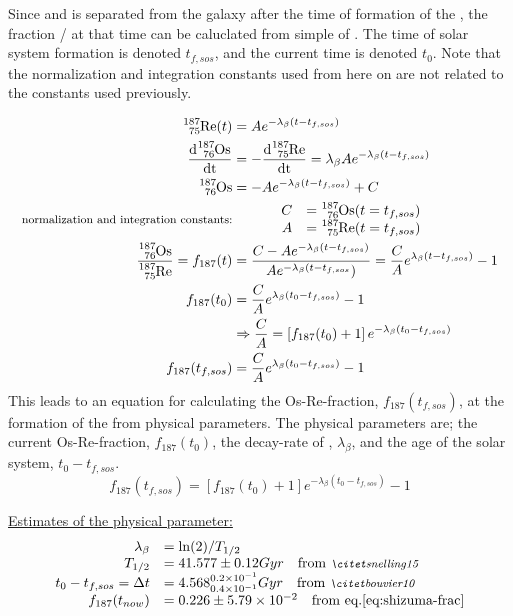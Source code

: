 Since  and  is separated from the galaxy after the time of formation of the \sos,
the fraction / at that time can be caluclated from simple \betadecay of .
The time of solar system formation is denoted $t_{f,sos}$, and the current time is denoted $t_0$.
Note that the normalization and integration constants used from here on are not related to the constants used previously.

\begin{align*}
  \re{187}(t) &= A e^{-\lambda_\beta (t-t_{f,sos})} \\
  \d{\os{187}} &= -\d{\re{187}} = \lambda_\beta A e^{-\lambda_\beta (t-t_{f,sos})} \\
  \os{187} &= - A e^{-\lambda_\beta (t-t_{f,sos})} + C \\
  \textrm{\footnotesize normalization and integration constants:} &
  \hspace{3em}
  \begin{array}{rl}
    C &= \os{187}(t=t_{f,sos}) \\
    A &= \re{187}(t=t_{f,sos})
  \end{array} \\
  \fraction = f_{187}(t) &= \frac{C - Ae^{-\lambda_\beta (t-t_{f,sos})}}{Ae^{-\lambda_\beta (t-t_{f,sos}})}
  = \frac{C}{A}e^{\lambda_\beta (t-t_{f,sos})} - 1 \\
  f_{187}(t_0) &= \frac{C}{A}e^{\lambda_\beta (t_0-t_{f,sos})} - 1 \\
  & \Rightarrow \frac{C}{A} = \left[ f_{187}(t_0) + 1\right]e^{-\lambda_\beta (t_0-t_{f,sos})} \\
  f_{187}(t_{f,sos}) &= \frac{C}{A}e^{\lambda_\beta (t_0-t_{f,sos})} - 1
\end{align*}
This leads to an equation for calculating the Os-Re-fraction, $f_{187}(t_{f,sos})$, at the formation of the \sos from physical parameters.
The physical parameters are; the current Os-Re-fraction, $f_{187}(t_{0})$, the decay-rate of , $\lambda_\beta$, and the age of the solar system, $t_0-t_{f,sos}$.
\begin{equation}
  \label{eq:frac-fsos}
  f_{187}(t_{f,sos}) = \left[ f_{187}(t_0) + 1\right]e^{-\lambda_\beta (t_0-t_{f,sos})} - 1
\end{equation}

\underline{Estimates of the physical parameter:}
\begin{equation}
  \label{eq:parameter-sources}
  \begin{array}{rl}
  \lambda_\beta &= \ln(2)/T_{1/2} \\
  T_{1/2} &= 41.577 \pm 0.12 Gyr \quad \textrm{from \mycite{snelling15}} \\
  t_0 - t_{f,sos} = \Delta t &= 4.568^{0.2\times 10^{-1}}_{0.4\times 10^{-1}} Gyr \quad \textrm{from \mycite{bouvier10}} \\
  \fracnow &= 0.226 \pm 5.79 \times 10^{-2} \quad \textrm{from eq.\ref{eq:shizuma-frac}}
  \end{array}
\end{equation}


